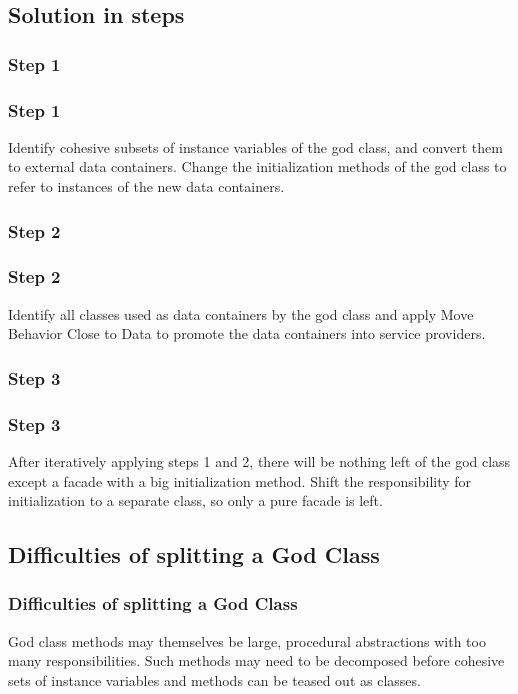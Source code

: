 \documentclass{beamer}
\begin{document}
\subsection{Solution in steps}
\subsubsection{Step 1}
\begin{frame}
\frametitle{Step 1}
Identify cohesive subsets of instance variables of the god class, and convert them to external data containers. Change the initialization methods of the god class to refer to instances of the new data containers.
\end{frame}
\subsubsection{Step 2}
\begin{frame}
\frametitle{Step 2}
Identify all classes used as data containers by the god class and apply Move Behavior Close to Data to promote the data containers into service providers.
\end{frame}
\subsubsection{Step 3}
\begin{frame}
\frametitle{Step 3}
After iteratively applying steps 1 and 2, there will be nothing left of the god class except a facade with a big initialization method. Shift the responsibility for initialization to a separate class, so only a pure facade is left.
\end{frame}
\subsection{Difficulties of splitting a God Class}
\begin{frame}
\frametitle{Difficulties of splitting a God Class}
God class methods may themselves be large, procedural abstractions with too many responsibilities. Such methods may need to be decomposed before cohesive sets of instance variables and methods can be teased out as classes.
\end{frame}
\end{document}
